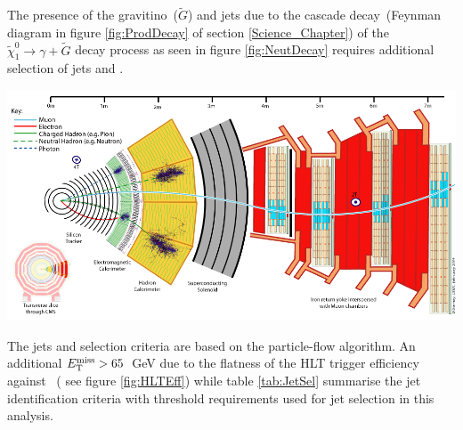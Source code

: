 The presence of the gravitino~($\tilde{G}$) and jets due to the cascade decay~(Feynman diagram in figure \ref{fig:ProdDecay} of section \ref{Science_Chapter}) of the $\tilde{\chi}^{0}_{1} \rightarrow \gamma + \tilde{G}$ decay process as seen in figure \ref{fig:NeutDecay} requires additional selection of jets and \MET.

\begin{center}
\centering
\includegraphics[scale=0.2]{THESISPLOTS/CMS_Slice.png}
\label{fig:NeutDecay}
\end{center}


The jets and \MET selection criteria are based on the particle-flow algorithm. An additional $E_{\mathrm{T}}^{\text{miss}} > 65$~GeV due to the flatness of the HLT trigger efficiency  against \MET ~( see figure \ref{fig:HLTEff}) while  table \ref{tab:JetSel} summarise the jet identification criteria with threshold requirements used for jet selection in this analysis.

